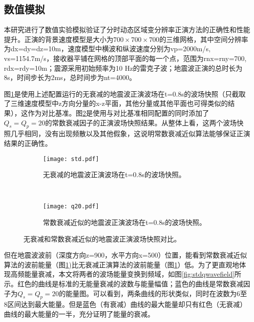 \subsection{数值模拟} %

本研究进行了数值实验模拟验证了分时动态区域变分辨率正演方法的正确性和性能提升。正演的背景速度模型是大小为$700\times700\times700$的三维网格，其中空间分辨率为dx=dy=dz=10m，速度模型中横波和纵波速度分别为vp=2000m/s, vs=1154.7m/s，接收器平铺在网格的顶部平面的每一个点，范围为rnx=rny=700, rdx=rdy=10m；震源采用初始频率为10 Hz的雷克子波；地震波正演的总时长为8s，时间步长为2ms，总时间步为nt=4000。

图\ref{fig:无衰减的地震波正演波场在t=0.8s的波场快照。}是使用上述配置运行的无衰减的地震波正演波场在t=0.8s的波场快照（只截取了三维速度模型中z方向分量的x-z平面，其他分量或其他平面也可得类似的结果），这作为对比基准。图\ref{fig:常数衰减近似的地震波正演波场在t=0.8s的波场快照。}是使用与对比基准相同配置的同时添加了$Q_s=Q_p=20$的常数衰减因子的正演波场快照结果。从整体上看，这两个波场快照几乎相同，没有出现频散以及其他假象，这说明常数衰减近似算法能够保证正演结果的正确性。

\begin{figure}[ht]
    \centering
    \begin{subfigure}[b]{0.5\textwidth}
        \centering
        \texttt{[image: std.pdf]}
        \caption{无衰减的地震波正演波场在t=0.8s的波场快照。}
        \label{fig:无衰减的地震波正演波场在t=0.8s的波场快照。}
    \end{subfigure}%
    ~
    \begin{subfigure}[b]{0.5\textwidth}
        \centering
        \texttt{[image: q20.pdf]}
        \caption{常数衰减近似的地震波正演波场在t=0.8s的波场快照。}
        \label{fig:常数衰减近似的地震波正演波场在t=0.8s的波场快照。}
    \end{subfigure}
    \caption{无衰减和常数衰减近似的地震波正演波场快照对比。}
    \label{fig:qwavefield}
\end{figure}

但在地震波波前（深度方向z=900，水平方向x=500）位置，能看到常数衰减近似算法的波前能量（图\ref{fig:无衰减的地震波正演波场在t=0.8s的波场快照。})比无衰减正演算法的波前能量（图\ref{fig:无衰减的地震波正演波场在t=0.8s的波场快照。}）低。为了更直观地体现高频能量衰减，本文将两者的波场能量变换到频域，如图\ref{fig:stdqwavefield}所示。红色的曲线是标准的无能量衰减的波数与能量幅值；蓝色的曲线是常数衰减因子为$Q_s=Q_p=20$的能量图。可以看到，两条曲线的形状类似，同时在波数为6至8区间达到最大能量。但是蓝色（有衰减）曲线的最大能量却只有红色（无衰减）曲线的最大能量的一半，充分证明了能量的衰减。

